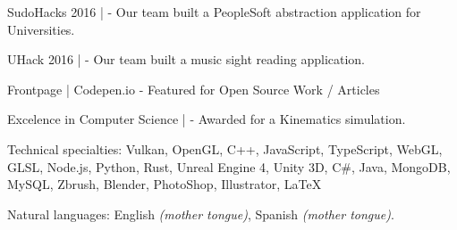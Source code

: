 \documentclass[10pt,a4paper]{article}
\begin{document}

\inlineheadsection %
{SudoHacks 2016 | }
{ - Our team built a PeopleSoft abstraction application for Universities.}

\inlineheadsection %
{UHack 2016 | }
{ - Our team built a music sight reading application.}

\inlineheadsection %
{Frontpage  | Codepen.io}
{ - Featured for Open Source Work / Articles}

\inlineheadsection %
{Excelence in Computer Science | }
{ - Awarded for a Kinematics simulation.}


\spacedhrule{1.6em}{-0.4em} %



\inlineheadsection %
{Technical specialties:}
{Vulkan, OpenGL, C++, JavaScript, TypeScript, WebGL, GLSL, Node.js, Python, Rust, Unreal Engine 4, Unity 3D, C\#, Java, MongoDB, MySQL, Zbrush, Blender, PhotoShop, Illustrator, LaTeX}


\inlineheadsection %
{Natural languages:}
{English \textit{(mother tongue)}, Spanish \textit{(mother tongue)}.}


\spacedhrule{1.6em}{-0.4em} %
\end{document}
